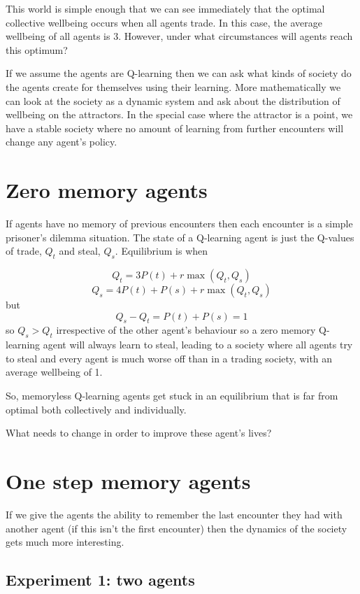 \documentclass[a4paper]{report}
\begin{document}
This world is simple enough that we can see immediately that the optimal collective wellbeing occurs when all agents trade. In this case, the average wellbeing of all agents is 3. However, under what circumstances will agents reach this optimum?

If we assume the agents are Q-learning then we can ask what kinds of society do the agents create for themselves using their learning. More mathematically we can look at the society as a dynamic system and ask about the distribution of wellbeing on the attractors. In the special case where the attractor is a point, we have a stable society where no amount of learning from further encounters will change any agent's policy.

\section{Zero memory agents}

If agents have no memory of previous encounters then each encounter is a simple prisoner's dilemma situation. The state of a Q-learning agent is just the Q-values of trade, $Q_t$ and steal, $Q_s$. Equilibrium is when
 
\[
Q_t = 3P(t) + r\max(Q_t, Q_s)
\]
\[
Q_s = 4P(t) + P(s) + r\max(Q_t, Q_s)
\]
but
\[
Q_s - Q_t = P(t) + P(s) = 1
\]
so $Q_s > Q_t$ irrespective of the other agent's behaviour so a zero memory Q-learning agent will always learn to steal, leading to a society where all agents try to steal and every agent is much worse off than in a trading society, with an average wellbeing of 1.

So, memoryless Q-learning agents get stuck in an equilibrium that is far from optimal both collectively and individually.

What needs to change in order to improve these agent's lives?

\section{One step memory agents}

If we give the agents the ability to remember the last encounter they had with another agent (if this isn't the first encounter) then the dynamics of the society gets much more interesting.

\subsection{Experiment 1: two agents}
\end{document}
